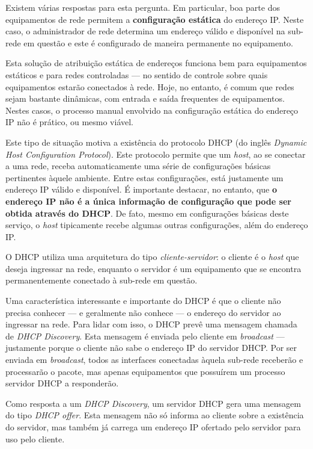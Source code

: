 \documentclass{article}
\begin{document}
Existem várias respostas para esta pergunta. Em particular, boa parte dos equipamentos de rede permitem a \textbf{configuração estática} do endereço IP. Neste caso, o administrador de rede determina um endereço válido e disponível na sub-rede em questão e este é configurado de maneira permanente no equipamento.

Esta solução de atribuição estática de endereços funciona bem para equipamentos estáticos e para redes controladas --- no sentido de controle sobre quais equipamentos estarão conectados à rede. Hoje, no entanto, é comum que redes sejam bastante dinâmicas, com entrada e saída frequentes de equipamentos. Nestes casos, o processo manual envolvido na configuração estática do endereço IP não é prático, ou mesmo viável.

Este tipo de situação motiva a existência do protocolo DHCP (do inglês \textit{Dynamic Host Configuration Protocol}). Este protocolo permite que um \textit{host}, ao se conectar a uma rede, receba automaticamente uma série de configurações básicas pertinentes àquele ambiente. Entre estas configurações, está justamente um endereço IP válido e disponível. É importante destacar, no entanto, que \textbf{o endereço IP não é a única informação de configuração que pode ser obtida através do DHCP}. De fato, mesmo em configurações básicas deste serviço, o \textit{host} tipicamente recebe algumas outras configurações, além do endereço IP.

O DHCP utiliza uma arquitetura do tipo \textit{cliente-servidor}: o cliente é o \textit{host} que deseja ingressar na rede, enquanto o servidor é um equipamento que se encontra permanentemente conectado à sub-rede em questão. 

Uma característica interessante e importante do DHCP é que o cliente não precisa conhecer --- e geralmente não conhece --- o endereço do servidor ao ingressar na rede. Para lidar com isso, o DHCP prevê uma mensagem chamada de \textit{DHCP Discovery}. Esta mensagem é enviada pelo cliente em \textit{broadcast} --- justamente porque o cliente não sabe o endereço IP do servidor DHCP. Por ser enviada em \textit{broadcast}, todos as interfaces conectadas àquela sub-rede receberão e processarão o pacote, mas apenas equipamentos que possuírem um processo servidor DHCP a responderão.

Como resposta a um \textit{DHCP Discovery}, um servidor DHCP gera uma mensagem do tipo \textit{DHCP offer}. Esta mensagem não só informa ao cliente sobre a existência do servidor, mas também já carrega um endereço IP ofertado pelo servidor para uso pelo cliente. 
\end{document}
